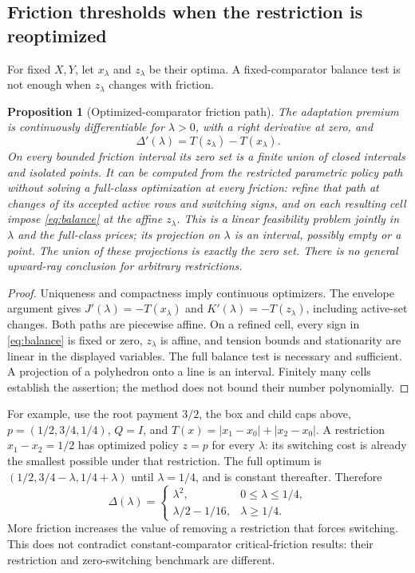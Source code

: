 \documentclass[11pt,letterpaper]{article}
\newtheorem{proposition}[theorem]{Proposition}
\theoremstyle{definition}\newtheorem{assumption}[theorem]{Assumption}
\begin{document}
\subsection{Friction thresholds when the restriction is reoptimized}
For fixed $X,Y$, let $x_\lambda$ and $z_\lambda$ be their optima. A fixed-comparator balance test is not enough when $z_\lambda$ changes with friction.
\begin{proposition}[Optimized-comparator friction path]\label{prop:friction}
The adaptation premium is continuously differentiable for $\lambda>0$, with a right derivative at zero, and
\begin{equation}\label{eq:friction}
 \Delta'(\lambda)=T(z_\lambda)-T(x_\lambda).
\end{equation}
On every bounded friction interval its zero set is a finite union of closed intervals and isolated points. It can be computed from the restricted parametric policy path without solving a full-class optimization at every friction: refine that path at changes of its accepted active rows and switching signs, and on each resulting cell impose \eqref{eq:balance} at the affine $z_\lambda$. This is a linear feasibility problem jointly in $\lambda$ and the full-class prices; its projection on $\lambda$ is an interval, possibly empty or a point. The union of these projections is exactly the zero set. There is no general upward-ray conclusion for arbitrary restrictions.
\end{proposition}
\begin{proof}
Uniqueness and compactness imply continuous optimizers. The envelope argument gives $J'(\lambda)=-T(x_\lambda)$ and $K'(\lambda)=-T(z_\lambda)$, including active-set changes. Both paths are piecewise affine. On a refined cell, every sign in \eqref{eq:balance} is fixed or zero, $z_\lambda$ is affine, and tension bounds and stationarity are linear in the displayed variables. The full balance test is necessary and sufficient. A projection of a polyhedron onto a line is an interval. Finitely many cells establish the assertion; the method does not bound their number polynomially.\end{proof}

For example, use the root payment $3/2$, the box and child caps above, $p=(1/2,3/4,1/4)$, $Q=I$, and $T(x)=|x_1-x_0|+|x_2-x_0|$. A restriction $x_1-x_2=1/2$ has optimized policy $z=p$ for every $\lambda$: its switching cost is already the smallest possible under that restriction. The full optimum is $(1/2,3/4-\lambda,1/4+\lambda)$ until $\lambda=1/4$, and is constant thereafter. Therefore
\begin{equation}\label{eq:friction-example}
 \Delta(\lambda)=\begin{cases}\lambda^2,&0\leq\lambda\leq1/4,\\
 \lambda/2-1/16,&\lambda\geq1/4.
 \end{cases}
\end{equation}
More friction increases the value of removing a restriction that forces switching. This does not contradict constant-comparator critical-friction results: their restriction and zero-switching benchmark are different.
\end{document}
